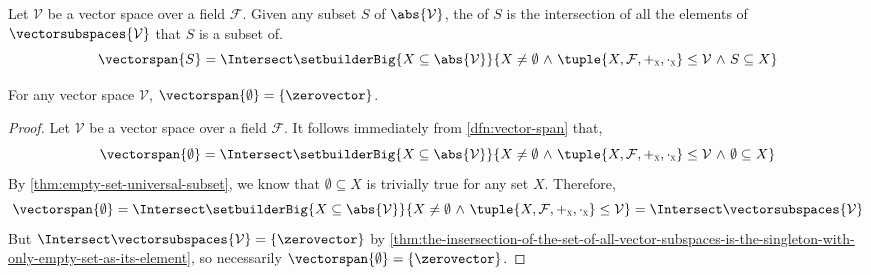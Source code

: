 \begin{dfn}[Span]
     \label{dfn:vector-span}
    Let \( \mathcal{V} \) be a vector space over a field \( \mathcal{F} \). Given any subset \( S \) of \( \abs{\mathcal{V}} \),
    the  of \( S \) is the intersection of all the elements of \( \vectorsubspaces{\mathcal{V}} \) that \( S \) is a
    subset of.
    \begin{equation*}
        \vectorspan{S} = \Intersect \setbuilderBig{X \subseteq \abs{\mathcal{V}}}{X \neq \emptyset \,\,{\land}\,\,
        \tuple{X, \mathcal{F}, \smallsubscript{+}{X}, \smallsubscript{\cdot}{X}} \leq \mathcal{V} \,\,{\land}\,\, S \subseteq X }
    \end{equation*}
\end{dfn}

\begin{thm}
     \label{thm:span-of-empty-set-is-the-singleton-containing-the-zero-vector}
    For any vector space \( \mathcal{V} \), \( \vectorspan{\emptyset} = \mleft\{ \zerovector \mright\} \).
\end{thm}

\begin{proof}
    Let \( \mathcal{V} \) be a vector space over a field \( \mathcal{F} \). It follows immediately from \cref{dfn:vector-span} that,
    \begin{equation*}
        \vectorspan{\emptyset} = \Intersect \setbuilderBig{X \subseteq \abs{\mathcal{V}}}{X \neq \emptyset \,\,{\land}\,\,
        \tuple{X, \mathcal{F}, \smallsubscript{+}{X}, \smallsubscript{\cdot}{X}} \leq \mathcal{V} \,\,{\land}\,\, \emptyset \subseteq X}
    \end{equation*}
    By \cref{thm:empty-set-universal-subset}, we know that \( \emptyset \subseteq X \) is trivially true for any set \( X \). Therefore,
    \begin{equation*}
        \vectorspan{\emptyset} = \Intersect \setbuilderBig{X \subseteq \abs{\mathcal{V}}}{X \neq \emptyset \,\,{\land}\,\,
        \tuple{X, \mathcal{F}, \smallsubscript{+}{X}, \smallsubscript{\cdot}{X}} \leq \mathcal{V}}
        = \Intersect \vectorsubspaces{\mathcal{V}}
    \end{equation*}
    But \( \Intersect \vectorsubspaces{\mathcal{V}} = \mleft\{ \zerovector \mright\} \) by
    \cref{thm:the-insersection-of-the-set-of-all-vector-subspaces-is-the-singleton-with-only-empty-set-as-its-element},
    so necessarily \( \vectorspan{\emptyset} = \mleft\{ \zerovector \mright\} \).
\end{proof}

